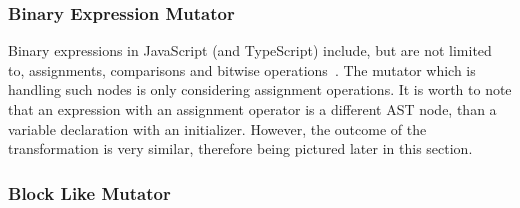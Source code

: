 \subsubsection{Binary Expression Mutator}

Binary expressions in JavaScript (and TypeScript) include, but are not limited to, assignments, comparisons and bitwise operations~\cite{expressions-and-operators:MDN:2017}. The mutator which is handling such nodes is only considering assignment operations. It is worth to note that an expression with an assignment operator is a different AST node, than a variable declaration with an initializer. However, the outcome of the transformation is very similar, therefore being pictured later in this section.

\subsubsection{Block Like Mutator}

